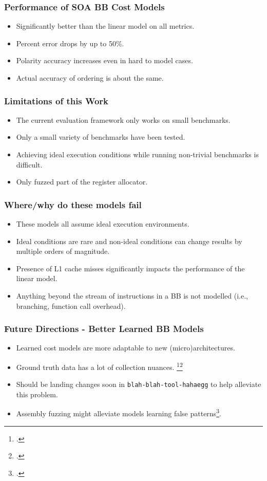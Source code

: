 \documentclass[light]{ucdbeamer}
\begin{document}
\begin{frame}[plain]
\frametitle{Performance of SOA BB Cost Models}
\begin{itemize}
  \item Significantly better than the linear model on all metrics.
  \item Percent error drops by up to 50\%.
  \item Polarity accuracy increases even in hard to model cases.
  \item Actual accuracy of ordering is about the same.
\end{itemize}
\end{frame}

\begin{frame}[plain]
\frametitle{Limitations of this Work}
\begin{itemize}
  \item The current evaluation framework only works on small benchmarks.
  \item Only a small variety of benchmarks have been tested.
  \item Achieving ideal execution conditions while running non-trivial benchmarks is difficult.
  \item Only fuzzed part of the register allocator.
\end{itemize}
\end{frame}

\begin{frame}[plain]
\frametitle{Where/why do these models fail}
\begin{itemize}
  \item These models all assume ideal execution environments.
  \item Ideal conditions are rare and non-ideal conditions can change results by multiple orders of magnitude.
  \item Presence of L1 cache misses significantly impacts the performance of the linear model.
  \item Anything beyond the stream of instructions in a BB is not modelled (i.e., branching, function call overhead).
\end{itemize}
\end{frame}

\begin{frame}[plain]
\frametitle{Future Directions - Better Learned BB Models}
\begin{itemize}
  \item Learned cost models are more adaptable to new (micro)architectures.
  \item Ground truth data has a lot of collection nuances. \footcite{abel_uica_2022}\footcite{chen_bhive_2019}
  \item Should be landing changes soon in \texttt{blah-blah-tool-hahaegg} to help alleviate this problem.
  \item Assembly fuzzing might alleviate models learning false patterns\footcite{ritter_anica_2022}.
\end{itemize}
\end{frame}
\end{document}
